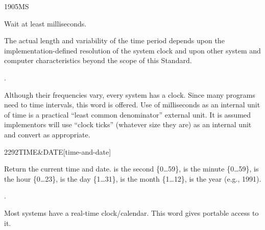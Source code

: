 \begin{worddef}{1905}{MS}
\item {}

	Wait at least  milliseconds.

\note
	The actual length and variability of the time period depends
	upon the implementation-defined resolution of the system clock
	and upon other system and computer characteristics beyond the
	scope of this Standard.

\see {}.

	\begin{rationale} %
		Although their frequencies vary, every system has a clock.
		Since many programs need to time intervals, this word is
		offered. Use of milliseconds as an internal unit of time is
		a practical ``least common denominator'' external unit. It
		is assumed implementors will use ``clock ticks'' (whatever
		size they are) as an internal unit and convert as appropriate.
	\end{rationale}
\end{worddef}


\begin{worddef}[TIMEandDATE]{2292}{TIME\&DATE}[time-and-date]
\item {}

	Return the current time and date.
	 is the second \{0{\ldots}59\},
	 is the minute \{0{\ldots}59\},
	 is the hour \{0{\ldots}23\},
	 is the day \{1{\ldots}31\},
	 is the month \{1{\ldots}12\}, 
	 is the year (e.g., 1991).

\see {}.

	\begin{rationale} %
		Most systems have a real-time clock/calendar.
		This word gives portable access to it.
	\end{rationale}
\end{worddef}

